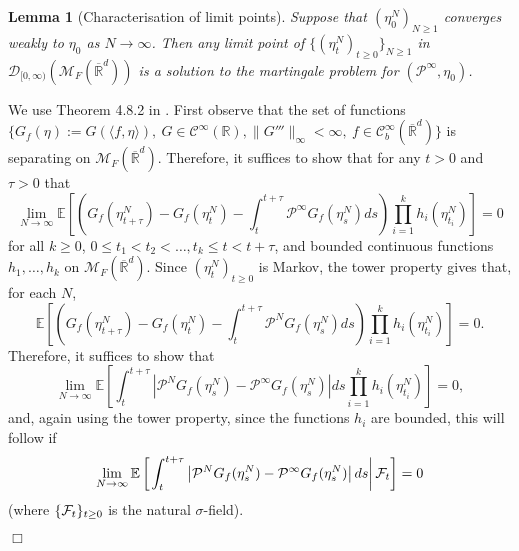 \documentclass[12pt]{article}
\newenvironment {proof}{{\noindent\bf Proof }}{\hfill $\Box$ \medskip}
\newtheorem{lemma}[theorem]{Lemma}
\newcommand{\IR}{\mathbb R}
\newcommand{\Pgen}{\mathcal{P}}    %
\newcommand{\cmeasures}{\mathcal{M}_F(\overline{\IR}^d)} %
\numberwithin{equation}{section}
\begin{document}
\begin{lemma}[Characterisation of limit points]
    \label{lem:limit_mgale}
Suppose that $(\eta^{N}_0)_{N\geq 1}$ converges weakly to $\eta_0$ as 
$N\to\infty$.
Then any limit point of $\{(\eta^{N}_t)_{t \geq 0}\}_{N\geq 1}$ 
in $\mathcal{D}_{[0,\infty)}(\cmeasures)$ 
is a solution to the martingale problem for 
$(\Pgen^\infty, \eta_0)$.
\end{lemma}
\begin{proof}
We use Theorem 4.8.2 in \cite{ethier/kurtz:1986}.
First observe that the set of functions
$\{G_f(\eta):= G(\langle f, \eta \rangle ),~
G \in \mathcal{C}^{\infty}(\IR), \|G'''\|_\infty<\infty,~
f \in \mathcal{C}_{b}^\infty(\overline{\IR}^d)\}$
is separating 
on $\mathcal{M}_F(\overline{\IR}^d)$.
Therefore, it suffices to show that for any $t>0$ and $\tau > 0$ that
\begin{equation}
    \label{eq: Convergence Condition}
\lim_{N \to \infty}
\mathbb{E}\left[
\left(
G_f(\eta^{N}_{t+\tau})-G_f(\eta^{N}_t)
-\int_{t}^{t+\tau}\Pgen^{\infty}G_f(\eta^{N}_s)ds
\right)
\prod_{i=1}^{k} h_i(\eta^{N}_{t_i})
\right]=0
\end{equation}
for all $k\geq 0$, $0\leq t_1<t_2<\ldots,t_k \leq t < t+\tau$,
and 
bounded continuous functions 
$h_1,\ldots,h_k$ on $\cmeasures$.
Since $(\eta^N_t)_{t\geq 0}$ is Markov, the tower property gives that,
for each $N$,
\begin{equation}
    \label{eq: Prelimit MP Application}
\mathbb{E}\left[
\left(
G_f(\eta^{N}_{t+\tau})-G_f(\eta^{N}_t)
-\int_{t}^{t+\tau}\Pgen^{N}G_f(\eta^{N}_s)ds
\right)
\prod_{i=1}^{k}h_i(\eta^{N}_{t_i})
\right]=0 .
\end{equation}
Therefore, it suffices to show that 
\begin{equation}
    \label{eq: Convergence of Spatial Generator}
\lim_{N \to \infty}
\mathbb{E}\left[
\int_{t}^{t+\tau}
\left|
\Pgen^{N}G_f(\eta^{N}_s)
-\Pgen^{\infty}G_f(\eta^{N}_s)
\right|
ds
\prod_{i=1}^{k}h_i(\eta^{N}_{t_i})
\right]=0,
\end{equation}
and, again using the tower property, since the functions $h_i$ are
bounded, this will follow if
\begin{equation}
\lim_{N \to \infty}
\mathbb{E}\left[\left.
\int_{t}^{t+\tau}
\left|
\Pgen^{N}G_f(\eta^{N}_s)
-\Pgen^{\infty}G_f(\eta^{N}_s)
\right|
ds\right| {\cal F}_t\right]=0
\end{equation}
(where $\{{\cal F}_t\}_{t\geq 0}$ is the natural $\sigma$-field).


\end{proof}
\end{document}
